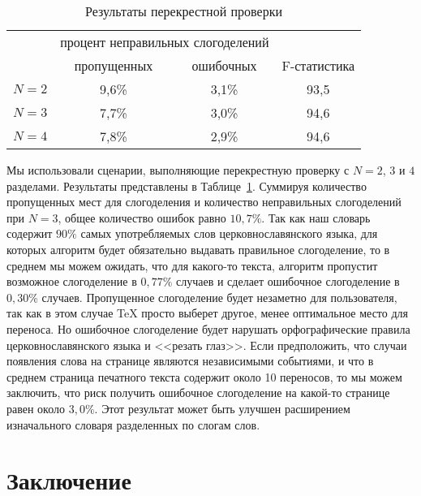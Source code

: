 \documentclass[12pt,a4paper,oneside]{extarticle}
\begin{document}
\begin{table}[ht]
\centering
\caption{Результаты перекрестной проверки \label{validation_results}}
\begin{tabular}{cccc}
		&	\multicolumn{2}{c}{процент неправильных слогоделений} & \\
		&	пропущенных		& ошибочных	& F-статистика \\
\hline
$N = 2$	& 	9,6\%			& 	3,1\% 	&	93,5 \\
$N = 3$ 	& 	7,7\%			& 	3,0\% 	& 	94,6	\\
$N = 4$ 	&	7,8\%			& 	2,9\% 	& 	94,6	\\
\hline
\end{tabular}
\end{table}

Мы использовали сценарии, выполняющие перекрестную проверку с $N = 2$, $3$ и $4$ разделами. Результаты представлены в Таблице~\ref{validation_results}. Суммируя количество пропущенных мест для слогоделения и количество неправильных слогоделений при  $N = 3$, общее количество ошибок равно $10,7\%$.  Так как наш словарь содержит $90\%$ самых употребляемых слов церковнославянского языка, для которых алгоритм будет обязательно выдавать правильное слогоделение, то в среднем мы можем ожидать, что для какого-то текста, алгоритм пропустит возможное слогоделение в $0,77\%$  случаев и сделает ошибочное слогоделение в $0,30\%$ случаев. Пропущенное слогоделение будет незаметно для пользователя, так как в этом случае \TeX{} просто выберет другое, менее оптимальное место для переноса. Но ошибочное слогоделение будет нарушать орфографические правила церковнославянского языка и <<резать глаз>>. Если предположить, что случаи появления слова на странице являются независимыми событиями, и что в среднем страница печатного текста содержит около 10 переносов, то мы можем заключить, что риск получить ошибочное слогоделение на какой-то странице равен около $3,0\%$. Этот результат может быть улучшен расширением изначального словаря разделенных по слогам слов.

\section{Заключение}
\end{document}
